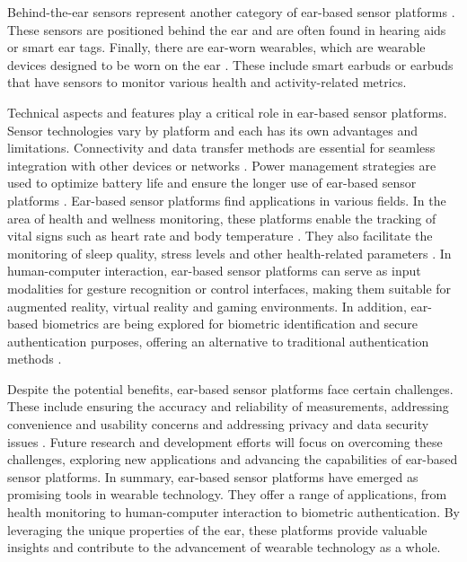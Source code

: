 Behind-the-ear sensors represent another category of ear-based sensor platforms \cite{phamWAKEBehindtheearWearable2020, gilSmartWirelessEarWorn2019, biWearableSensorEating2017}.
These sensors are positioned behind the ear and are often found in hearing aids or smart ear tags. 
Finally, there are ear-worn wearables, which are wearable devices designed to be worn on the ear \cite{biWearableSensorEating2017, gilSmartWirelessEarWorn2019}. 
These include smart earbuds or earbuds that have sensors to monitor various health and activity-related metrics.

Technical aspects and features play a critical role in ear-based sensor platforms. 
Sensor technologies vary by platform and each has its own advantages and limitations.
Connectivity and data transfer methods are essential for seamless integration with other devices or networks \cite{perezRecentAdvancesWearable2021}. 
Power management strategies are used to optimize battery life and ensure the longer use of ear-based sensor platforms \cite{nguyenInearBiosignalRecording2016}.
Ear-based sensor platforms find applications in various fields. 
In the area of health and wellness monitoring, these platforms enable the tracking of vital signs such as heart rate and body temperature \cite{roddigerRespirationRateMonitoring2020, atallahErgonomicWearableCore2018, maseHearablesNewPerspectives2020, rajbhandaryFeasibilityContinuousMonitoring2020a}.
They also facilitate the monitoring of sleep quality, stress levels and other health-related parameters \cite{luekenPhotoplethysmographybasedInearSensor2017, wendtThermoregulationExerciseHeat2007}. 
In human-computer interaction, ear-based sensor platforms can serve as input modalities for gesture recognition or control interfaces, making them suitable for augmented reality, virtual reality and gaming environments. 
In addition, ear-based biometrics are being explored for biometric identification and secure authentication purposes, offering an alternative to traditional authentication methods \cite{roddigerSensingEarablesSystematic2022a}.

Despite the potential benefits, ear-based sensor platforms face certain challenges. 
These include ensuring the accuracy and reliability of measurements, addressing convenience and usability concerns and addressing privacy and data security issues \cite{bockAccuracyNewInfrared2005, roddigerRespirationRateMonitoring2020, bonziAccuracyPeripheralThermometers2016, gasimAccuracyTympanicTemperature2013, amoateng-adjepongAccuracyInfraredTympanic1999a, ericksonComparisonEarbasedBladder1993, chagllae.MeasurementCoreBody2018}. 
Future research and development efforts will focus on overcoming these challenges, exploring new applications and advancing the capabilities of ear-based sensor platforms.
In summary, ear-based sensor platforms have emerged as promising tools in wearable technology. 
They offer a range of applications, from health monitoring to human-computer interaction to biometric authentication. 
By leveraging the unique properties of the ear, these platforms provide valuable insights and contribute to the advancement of wearable technology as a whole.

